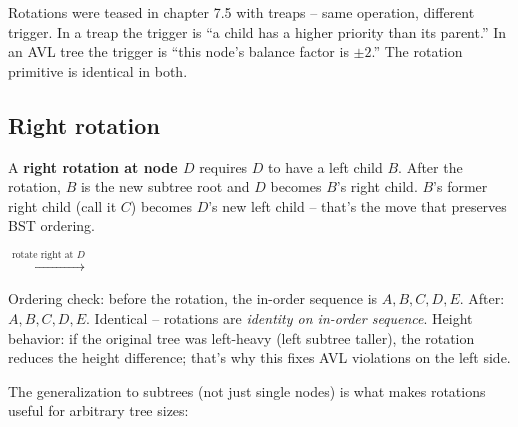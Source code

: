 \documentclass[11pt]{article}
\begin{document}
Rotations were teased in chapter 7.5 with treaps -- same operation, different trigger. In a treap the trigger is ``a child has a higher priority than its parent.'' In an AVL tree the trigger is ``this node's balance factor is $\pm 2$.'' The rotation primitive is identical in both.

\subsection*{Right rotation}

A \textbf{right rotation at node $D$} requires $D$ to have a left child $B$. After the rotation, $B$ is the new subtree root and $D$ becomes $B$'s right child. $B$'s former right child (call it $C$) becomes $D$'s new left child -- that's the move that preserves BST ordering.

\begin{center}
\quad $\xrightarrow{\text{rotate right at } D}$ \quad
{}
\end{center}

Ordering check: before the rotation, the in-order sequence is $A, B, C, D, E$. After: $A, B, C, D, E$. Identical -- rotations are \emph{identity on in-order sequence}. Height behavior: if the original tree was left-heavy (left subtree taller), the rotation reduces the height difference; that's why this fixes AVL violations on the left side.

The generalization to subtrees (not just single nodes) is what makes rotations useful for arbitrary tree sizes:
\end{document}
